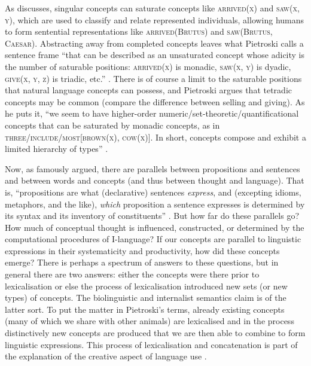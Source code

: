 As \citet[249]{Pietroski2010} discusses, singular concepts can saturate concepts like \textsc{arrived(x)} and \textsc{saw(x, y)}, which are used to classify and relate represented individuals, allowing humans to form sentential representations like \textsc{arrived(Brutus)} and \textsc{saw(Brutus, Caesar)}. Abstracting away from completed concepts leaves what Pietroski calls a sentence frame “that can be described as an unsaturated concept whose adicity is the number of saturable positions: \textsc{arrived(x)} is monadic, \textsc{saw(x, y)} is dyadic, \textsc{give(x, y, z)} is triadic, etc.” \citep[249]{Pietroski2010}. There is of course a limit to the saturable positions that natural language concepts can possess, and Pietroski argues that tetradic concepts may be common (compare the difference between selling and giving). As he puts it, “we seem to have higher-order numeric/set-theoretic/quantificational concepts that can be saturated by monadic concepts, as in \textsc{three/include/most[brown(x), cow(x)]}. In short, concepts compose and exhibit a limited hierarchy of types” \citep[249]{Pietroski2010}.

Now, as \citet{Fodor1975} famously argued, there are parallels between propositions and sentences and between words and concepts (and thus between thought and language). That is, “propositions are what (declarative) sentences \textit{express}, and (excepting idioms, metaphors, and the like), \textit{which} proposition a sentence expresses is determined by its syntax and its inventory of constituents” \citep[8, emphasis in original]{FodorPylyshyn2015}. But how far do these parallels go? How much of conceptual thought is influenced, constructed, or determined by the computational procedures of I-language? If our concepts are parallel to linguistic expressions in their systematicity and productivity, how did these concepts emerge? There is perhaps a spectrum of answers to these questions, but in general there are two answers: either the concepts were there prior to lexicalisation or else the process of lexicalisation introduced new sets (or new types) of concepts. The biolinguistic and internalist semantics claim is of the latter sort. To put the matter in Pietroski’s terms, already existing concepts (many of which we share with other animals) are lexicalised and in the process distinctively new concepts are produced that we are then able to combine to form linguistic expressions. This process of lexicalisation and concatenation is part of the  explanation of the creative aspect of language use \citep{Chomsky1966,McGilvray2001,McGilvray2005,Asoulin2013}.
	
